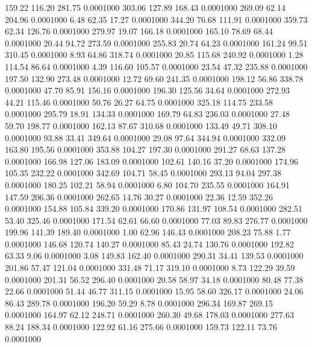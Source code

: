  159.22  116.20  281.75   0.0001000
 303.06  127.89  168.43   0.0001000
 269.09   62.14  204.96   0.0001000
   6.48   62.35   17.27   0.0001000
 344.20   76.68  111.91   0.0001000
 359.73   62.34  126.76   0.0001000
 279.97   19.07  166.18   0.0001000
 165.10   78.69   68.44   0.0001000
  20.44   94.72  273.59   0.0001000
 255.83   20.74   64.23   0.0001000
 161.24   99.51  310.45   0.0001000
   8.93   64.86  318.74   0.0001000
  20.85  115.68  240.92   0.0001000
   1.28  114.54   86.64   0.0001000
   4.39  116.60  105.57   0.0001000
  23.54   47.32  235.88   0.0001000
 197.50  132.90  273.48   0.0001000
  12.72   69.60  241.35   0.0001000
 198.12   56.86  338.78   0.0001000
  47.70   85.91  156.16   0.0001000
 196.30  125.56   34.64   0.0001000
 272.93   44.21  115.46   0.0001000
  50.76   26.27   64.75   0.0001000
 325.18  114.75  233.58   0.0001000
 295.79   18.91  134.33   0.0001000
 169.79   64.83  236.03   0.0001000
  27.48   59.70  198.77   0.0001000
 162.13   87.67  310.68   0.0001000
 133.49   49.71  308.10   0.0001000
  93.88   33.41  349.64   0.0001000
  29.08   97.64  344.94   0.0001000
 332.09  163.80  195.56   0.0001000
 353.88  104.27  197.30   0.0001000
 291.27   68.63  137.28   0.0001000
 166.98  127.06  183.09   0.0001000
 102.61  140.16   37.20   0.0001000
 174.96  105.35  232.22   0.0001000
 342.69  104.71   58.45   0.0001000
 293.13   94.04  297.38   0.0001000
 180.25  102.21   58.94   0.0001000
   6.80  104.70  235.55   0.0001000
 164.91  147.59  206.36   0.0001000
 262.65   14.76   30.27   0.0001000
  22.36   12.59  352.26   0.0001000
 154.88  105.84  339.20   0.0001000
 170.86  131.97  108.54   0.0001000
 282.51   53.40  325.46   0.0001000
 171.54   62.61   66.60   0.0001000
  77.03   89.83  276.77   0.0001000
 199.96  141.39  189.40   0.0001000
   1.00   62.96  146.43   0.0001000
 208.23   75.88    1.77   0.0001000
 146.68  120.74  140.27   0.0001000
  85.43   24.74  130.76   0.0001000
 192.82   63.33    9.06   0.0001000
   3.08  149.83  162.40   0.0001000
 290.31   34.41  139.53   0.0001000
 201.86   57.47  121.04   0.0001000
 331.48   71.17  319.10   0.0001000
   8.73  122.29   39.59   0.0001000
 201.31   56.52  296.40   0.0001000
  20.58   58.97   34.18   0.0001000
  80.48   77.38   22.66   0.0001000
  51.44   46.77  311.15   0.0001000
  15.95   58.60  326.17   0.0001000
  24.06   86.43  289.78   0.0001000
 196.20   59.29    8.78   0.0001000
 296.34  169.87  269.15   0.0001000
 164.97   62.12  248.71   0.0001000
 260.30   49.68  178.03   0.0001000
 277.63   88.24  188.34   0.0001000
 122.92   61.16  275.66   0.0001000
 159.73  122.11   73.76   0.0001000
